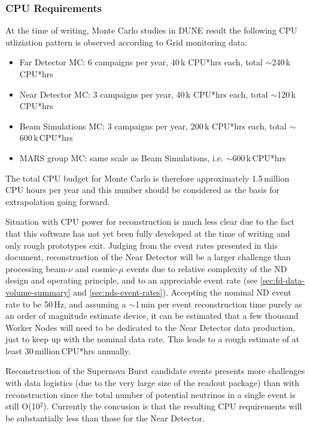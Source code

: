 \subsubsection{CPU Requirements}
At the time of writing, Monte Carlo studies in DUNE result the following CPU utliziation pattern is observed according to Grid monitoring data:
\begin{itemize}

\item Far Detector MC: 6 campaigns per year, 40\,k CPU*hrs each, total $\sim$240\,k\,CPU*hrs

\item Near Detector MC: 3 campaigns per year, 40\,k CPU*hrs each, total $\sim$120\,k\,CPU*hrs

\item Beam Simulations MC: 3 campaigns per year, 200\,k CPU*hrs each, total $\sim$600\,k\,CPU*hrs

\item MARS group MC: same scale as Beam Simulations, i.e. $\sim$600\,k\,CPU*hrs

\end{itemize}

\noindent
The total CPU budget for Monte Carlo is therefore approximately 1.5\,million CPU hours per year and this number
should be considered as the basis for extrapolation going forward.

Situation with CPU power for reconstruction is much less clear due to the fact that this software has not yet been fully
developed at the time of writing and only rough prototypes exit. Judging from the event rates presented in this document,
reconstruction of the Near Detector will be a larger challenge than processing beam-$\nu$ and cosmic-$\mu$ events due
to relative complexity of the ND design and operating principle, and to an appreciable event rate
(see \ref{sec:fd-data-volume-summary} and \ref{sec:nds-event-rates}). Accepting the nominal ND event rate to be 50\,Hz,
and assuming a $\sim$1\,min per event reconstruction time purely as an order of magnitude estimate device, it can be estimated
that a few thousand Worker Nodes will need to be dedicated to the Near Detector data production, just to keep up with the nominal
data rate. This leads to a rough estimate of at least 30\,million\,CPU*hrs annually.

Reconstruction of the Supernova Burst candidate events presents more challenges with data logistics (due to the very large size
of the readout package) than with reconstruction since the total number of potential neutrinos in a single event is still O(10$^2$).
Currently the concusion is that the resulting CPU requirements will be substantially less than those for the Near Detector.




